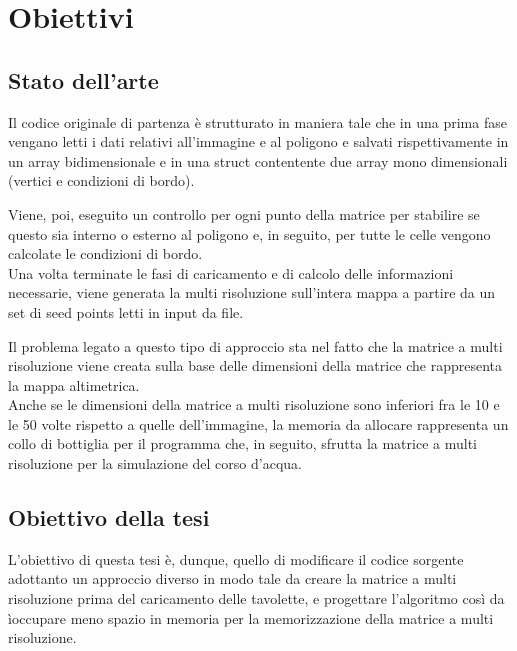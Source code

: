 \chapter{Obiettivi}

	\section{Stato dell'arte}
	Il codice originale di partenza \`{e} strutturato in maniera tale che in una prima fase vengano letti i dati relativi all'immagine e al poligono e salvati rispettivamente in un array bidimensionale e in una struct contentente due array mono dimensionali (vertici e condizioni di bordo). 

	Viene, poi, eseguito un controllo per ogni punto della matrice per stabilire se questo sia interno o esterno al poligono e, in seguito, per tutte le celle vengono calcolate le condizioni di bordo. \\
	Una volta terminate le fasi di caricamento e di calcolo delle informazioni necessarie, viene generata la multi risoluzione sull'intera mappa a partire da un set di seed points letti in input da file.

	Il problema legato a questo tipo di approccio sta nel fatto che la matrice a multi risoluzione viene creata sulla base delle dimensioni della matrice che rappresenta la mappa altimetrica. \\
	Anche se le dimensioni della matrice a multi risoluzione sono inferiori fra le 10 e le 50 volte rispetto a quelle dell'immagine, la memoria da allocare rappresenta un collo di bottiglia per il programma che, in seguito, sfrutta la matrice a multi risoluzione per la simulazione del corso d'acqua.
	\section{Obiettivo della tesi}
	L'obiettivo di questa tesi \`{e}, dunque, quello di modificare il codice sorgente adottanto un approccio diverso in modo tale da creare la matrice a multi risoluzione prima del caricamento delle tavolette, e progettare l'algoritmo cos\`{i} da \`{i}occupare meno spazio in memoria per la memorizzazione della matrice a multi risoluzione. 

